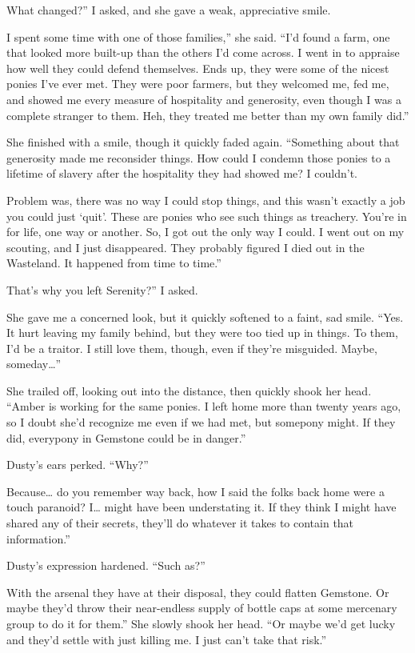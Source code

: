 \leavevmode{}What changed?” I asked, and she gave a weak, appreciative smile.

\leavevmode{}I spent some time with one of those families,” she said. “I’d found a farm, one that looked more built-up than the others I’d come across. I went in to appraise how well they could defend themselves. Ends up, they were some of the nicest ponies I’ve ever met. They were poor farmers, but they welcomed me, fed me, and showed me every measure of hospitality and generosity, even though I was a complete stranger to them. Heh, they treated me better than my own family did.”

She finished with a smile, though it quickly faded again. “Something about that generosity made me reconsider things. How could I condemn those ponies to a lifetime of slavery after the hospitality they had showed me? I couldn’t.

\leavevmode{}Problem was, there was no way I could stop things, and this wasn’t exactly a job you could just ‘quit’. These are ponies who see such things as treachery. You’re in for life, one way or another. So, I got out the only way I could. I went out on my scouting, and I just disappeared. They probably figured I died out in the Wasteland. It happened from time to time.”

\leavevmode{}That’s why you left Serenity?” I asked.

She gave me a concerned look, but it quickly softened to a faint, sad smile. “Yes. It hurt leaving my family behind, but they were too tied up in things. To them, I’d be a traitor. I still love them, though, even if they’re misguided. Maybe, someday…”

She trailed off, looking out into the distance, then quickly shook her head. “Amber is working for the same ponies. I left home more than twenty years ago, so I doubt she’d recognize me even if we had met, but somepony might. If they did, everypony in Gemstone could be in danger.”

Dusty’s ears perked. “Why?”

\leavevmode{}Because… do you remember way back, how I said the folks back home were a touch paranoid? I… might have been understating it. If they think I might have shared any of their secrets, they’ll do whatever it takes to contain that information.”

Dusty’s expression hardened. “Such as?”

\leavevmode{}With the arsenal they have at their disposal, they could flatten Gemstone. Or maybe they’d throw their near-endless supply of bottle caps at some mercenary group to do it for them.” She slowly shook her head. “Or maybe we’d get lucky and they’d settle with just killing me. I just can’t take that risk.”

